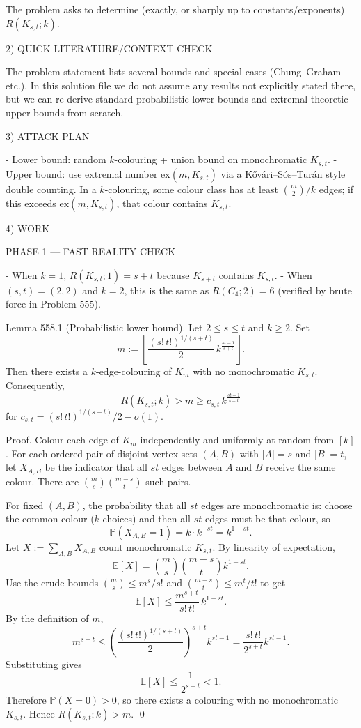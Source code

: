 The problem asks to determine (exactly, or sharply up to constants/exponents) $R(K_{s,t};k)$.

2) QUICK LITERATURE/CONTEXT CHECK

The problem statement lists several bounds and special cases (Chung--Graham etc.). In this solution file we do not assume any results not explicitly stated there, but we can re-derive standard probabilistic lower bounds and extremal-theoretic upper bounds from scratch.

3) ATTACK PLAN

- Lower bound: random $k$-colouring + union bound on monochromatic $K_{s,t}$.
- Upper bound: use extremal number $\mathrm{ex}(m,K_{s,t})$ via a K\H{o}v\'ari--S\'os--Tur\'an style double counting. In a $k$-colouring, some colour class has at least $\binom{m}{2}/k$ edges; if this exceeds $\mathrm{ex}(m,K_{s,t})$, that colour contains $K_{s,t}$.

4) WORK

PHASE 1 — FAST REALITY CHECK

- When $k=1$, $R(K_{s,t};1)=s+t$ because $K_{s+t}$ contains $K_{s,t}$.
- When $(s,t)=(2,2)$ and $k=2$, this is the same as $R(C_4;2)=6$ (verified by brute force in Problem 555).

Lemma 558.1 (Probabilistic lower bound).
Let $2\le s\le t$ and $k\ge 2$.
Set
\[
m:=\left\lfloor \frac{(s!\,t!)^{1/(s+t)}}{2}\, k^{\frac{st-1}{s+t}}\right\rfloor.
\]
Then there exists a $k$-edge-colouring of $K_m$ with no monochromatic $K_{s,t}$.
Consequently,
\[
R(K_{s,t};k) > m \ge c_{s,t}\,k^{\frac{st-1}{s+t}}
\]
for $c_{s,t}=(s!\,t!)^{1/(s+t)}/2 - o(1)$.

Proof.
Colour each edge of $K_m$ independently and uniformly at random from $[k]$.
For each ordered pair of disjoint vertex sets $(A,B)$ with $|A|=s$ and $|B|=t$, let $X_{A,B}$ be the indicator that all $st$ edges between $A$ and $B$ receive the same colour.
There are $\binom{m}{s}\binom{m-s}{t}$ such pairs.

For fixed $(A,B)$, the probability that all $st$ edges are monochromatic is:
choose the common colour ($k$ choices) and then all $st$ edges must be that colour, so
\[
\mathbb P(X_{A,B}=1)=k\cdot k^{-st}=k^{1-st}.
\]
Let $X:=\sum_{A,B} X_{A,B}$ count monochromatic $K_{s,t}$.
By linearity of expectation,
\[
\mathbb E[X]=\binom{m}{s}\binom{m-s}{t}k^{1-st}.
\]
Use the crude bounds $\binom{m}{s}\le m^s/s!$ and $\binom{m-s}{t}\le m^t/t!$ to get
\[
\mathbb E[X]\le \frac{m^{s+t}}{s!\,t!}\,k^{1-st}.
\]
By the definition of $m$,
\[
m^{s+t}\le \left(\frac{(s!\,t!)^{1/(s+t)}}{2}\right)^{s+t}k^{st-1}=\frac{s!\,t!}{2^{s+t}}k^{st-1}.
\]
Substituting gives
\[
\mathbb E[X]\le \frac{1}{2^{s+t}}<1.
\]
Therefore $\mathbb P(X=0)>0$, so there exists a colouring with no monochromatic $K_{s,t}$.
Hence $R(K_{s,t};k)>m$.
\qed

